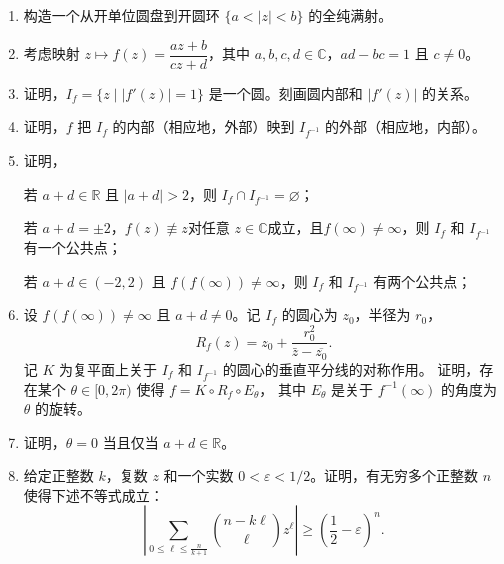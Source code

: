 \begin{enumerate}
\item[4.]
构造一个从开单位圆盘到开圆环 \(\{a < |z| < b\}\) 的全纯满射。


\item[5.]
考虑映射 \( z \mapsto f(z) = \dfrac{az + b}{cz + d} \)，其中 \(a, b, c, d \in \mathbb{C}\)，\(ad - bc = 1\) 且 \(c \neq 0\)。
\item[(1)] 证明，\(I_f = \{z \mid |f'(z)| = 1\}\) 是一个圆。刻画圆内部和 \(|f'(z)|\) 的关系。
\item[(2)] 证明，\(f\) 把 \(I_f\) 的内部（相应地，外部）映到 \(I_{f^{-1}}\) 的外部（相应地，内部）。
\item[(3)] 证明，
\begin{center}
    若 \(a + d \in \mathbb{R}\) 且 \(|a + d| > 2\)，则 \(I_f \cap I_{f^{-1}} = \varnothing\)；

    若 \(a + d = \pm 2\)，\(f(z) \not\equiv z\)对任意 \(z \in \mathbb{C}\)成立，且\(f(\infty) \neq \infty\)，则 \(I_f\) 和 \(I_{f^{-1}}\) 有一个公共点；

    若 \(a + d \in (-2, 2)\) 且 \(f(f(\infty)) \neq \infty\)，则 \(I_f\) 和 \(I_{f^{-1}}\) 有两个公共点；
\end{center}
\item[(4)] 设 \(f(f(\infty)) \neq \infty\) 且 \(a + d \neq 0\)。记 \(I_f\) 的圆心为 \(z_0\)，半径为 \(r_0\)，
\[
R_f(z) = z_0 + \frac{r_0^2}{\bar{z} - \overline{z_0}}.
\]
记 \(K\) 为复平面上关于 \(I_f\) 和 \(I_{f^{-1}}\) 的圆心的垂直平分线的对称作用。
证明，存在某个 \(\theta \in [0, 2\pi)\) 使得 \(f = K \circ R_f \circ E_\theta\)，
其中 \(E_\theta\) 是关于 \(f^{-1}(\infty)\) 的角度为 \(\theta\) 的旋转。
\item[(5)] 证明，\(\theta = 0\) 当且仅当 \(a + d \in \mathbb{R}\)。

\item[6.] 给定正整数 \(k\)，复数 \(z\) 和一个实数 \(0 < \varepsilon < 1/2\)。证明，有无穷多个正整数 \(n\) 使得下述不等式成立：
\[
\left| \sum_{0 \leqslant \ell \leqslant \frac{n}{k+1}} \binom{n - k \ell}{\ell} z^\ell \right| 
\geqslant \left( \frac{1}{2} - \varepsilon \right)^n.
\]
\end{enumerate}

